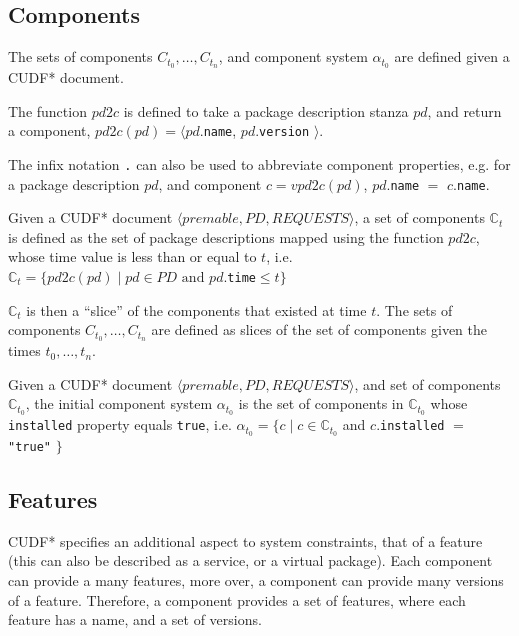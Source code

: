 \subsection{Components}
The sets of components $C_{t_0},\ldots,C_{t_n}$, and component system $\alpha_{t_{0}}$ are defined given a CUDF* document.

\begin{defs}
The function $pd2c$ is defined to take a package description stanza $pd$, and return a component, $pd2c(pd) = \langle pd.$\texttt{name}, $pd.$\texttt{version} $\rangle$.
\end{defs}

The infix notation \texttt{.} can also be used to abbreviate component properties, e.g. for a package description $pd$, and component $c = vpd2c(pd)$, $pd$.\texttt{name} $=$ $c$.\texttt{name}.

\begin{defs}
Given a CUDF* document $\langle premable, PD, REQUESTS \rangle$, a set of components $\mathbb{C}_{t}$ is defined as the set of package descriptions mapped using the function $pd2c$,
whose time value is less than or equal to $t$,
i.e. $\mathbb{C}_{t} = \{pd2c(pd) \mid pd \in PD \text{ and } pd$.\texttt{time}$ \leq t\}$
\end{defs}
$\mathbb{C}_{t}$ is then a ``slice'' of the components that existed at time $t$.
The sets of components $C_{t_0},\ldots,C_{t_n}$ are defined as slices of the set of components given the times $t_0,\ldots,t_n$.

\begin{defs}
Given a CUDF* document $\langle premable, PD, REQUESTS \rangle$, and set of components $\mathbb{C}_{t_0}$,
the initial component system $\alpha_{t_0}$ is the set of components in $\mathbb{C}_{t_0}$ whose \texttt{installed} property equals \texttt{true},
i.e. $\alpha_{t_{0}} = \{c \mid c \in \mathbb{C}_{t_0} $ and $ c.$\texttt{installed} $=$ \texttt{"true"} $\}$
\end{defs}

\subsection{Features}
CUDF* specifies an additional aspect to system constraints, that of a feature (this can also be described as a service, or a virtual package).
Each component can provide a many features, more over, a component can provide many versions of a feature.
Therefore, a component provides a set of features, where each feature has a name, and a set of versions.

